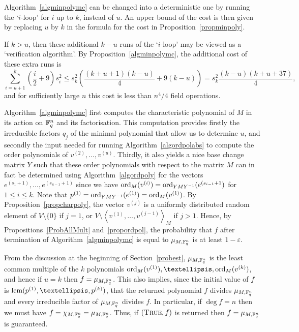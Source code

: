 \begin{Rem}
    \label{algdeterm}
    Algorithm~\ref{algminpolymc} can be changed into a deterministic
    one by running the `$i$-loop' for $i$ up to $k$, instead of $u$. An upper
    bound of the cost is then given by replacing $u$ by $k$ in the
    formula for the cost in Proposition~\ref{propminpoly}.

If $k>u$, then these additional $k-u$ runs of the `$i$-loop' may be viewed as 
a `verification  algorithm'. By Proposition~\ref{algminpolymc}, 
%
the additional cost of these extra runs is
\[
\sum_{i=u+1}^k(\frac{i}{2}+9)s_i^2 \leq s_k^2\left(\frac{(k+u+1)(k-u)}{4}+9(k-u)\right)
= s_k^2\frac{(k-u)(k+u+37)}{4},
\]
and for sufficiently large $n$ this cost is less than 
$n^4/4$ field operations.
\end{Rem}

Algorithm~\ref{algminpolymc} first computes the characteristic
polynomial of $M$ in its action on $\mathbb{F}_q^n$ and its factorisation.
This computation provides firstly the irreducible factors $q_j$ of
the minimal polynomial that allow us to determine $u$, and secondly
the input needed for running Algorithm~\ref{algordpolabs} to compute
the order polynomials of $v^{(2)}, \ldots, 
v^{(u)}$. Thirdly, it also yields a nice base change matrix $Y$ such 
that these order polynomials with respect to the matrix $M$ can in
fact be determined using Algorithm~\ref{algordpoly} for the vectors
$e^{(s_1+1)},\ldots,e^{(s_{u-1}+1)}$ since we have
$\mathrm{ord}_M(v^{(i)}) = \mathrm{ord}_{YMY^{-1}}(e^{(s_{i-1}+1})$ for $1 \le i \le
k$. Note that
$p^{(1)} = \mathrm{ord}_{YMY^{-1}}(e^{(1)}) = \mathrm{ord}_M(v^{(1)})$. 
By Proposition~\ref{propcharpoly},
the vector $v^{(j)}$ is a uniformly distributed random element of
$V\setminus\{0\}$ if $j=1$, or $V\setminus\left< v^{(1)}, \ldots,
v^{(j-1)}\right>_M$ if $j>1$. Hence, by Propositions~\ref{ProbAllMult}
and~\ref{propordpol}, the probability that $f$ after termination of
Algorithm~\ref{algminpolymc} is equal to $\mu_{M,\mathbb{F}_q^n}$ is at least
$1-\varepsilon$.

  From the discussion at the beginning of Section~\ref{probest},
$\mu_{M,\mathbb{F}_q^n}$ is the least common multiple of the $k$ polynomials
$\ord_M(v^{(1)}), \dots,\ord_M(v^{(k)})$, and hence if $u=k$ then
$f = \mu_{M,\mathbb{F}_q^n}$. This also implies, since the initial value
of $f$ is $\lcm(p^{(1)}, \ldots, p^{(k)})$, that the returned
polynomial $f$ divides $\mu_{M,\mathbb{F}_q^n}$ and every irreducible factor of
$\mu_{M,\mathbb{F}_q^n}$ divides $f$. In particular, if $\deg f =n$ then we must
have $f=\chi_{M,\mathbb{F}_q^n}=\mu_{M,\mathbb{F}_q^n}$. Thus, if $(\mbox{\sc True},f)$
is returned then $f = \mu_{M,\mathbb{F}_q^n}$ is guaranteed.


